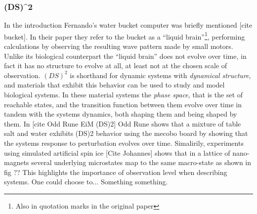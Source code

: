 \subsubsection{(DS)^2}
%
In the introduction Fernando's water bucket computer was briefly mentioned [cite
bucket].
In their paper they refer to the bucket as a ``liquid brain''\footnote{Also in
  quotation marks in the original paper}, performing calculations by observing
the resulting wave pattern made by small motors.
Unlike its biological counterpart the ``liquid brain'' does not evolve over
time, in fact it has no structure to evolve at all, at least not at the chosen
scale of observation.
%
$(DS)^2$ is shorthand for dynamic systems with \emph{dynamical structure}, and
materials that exhibit this behavior can be used to study and model biological
systems.
In these material systems the \emph{phase space}, that is the set of reachable
states, and the transition function between them evolve over time in tandem with
the systems dynamics, both shaping them and being shaped by them.
%
In [cite Odd Rune EiM (DS)2] Odd Rune shows that a mixture of table salt and
water exhibits (DS)2 behavior using the mecobo board by showing that the systems
response to perturbation evolves over time.
%
Simalirily, experiments using simulated artificial spin ice [Cite Johannes]
shows that in a lattice of nano-magnets several underlying microstates map to the
same macro-state as shown in fig ??
This highlights the importance of observation level when describing systems.
One could choose to... Something something.

